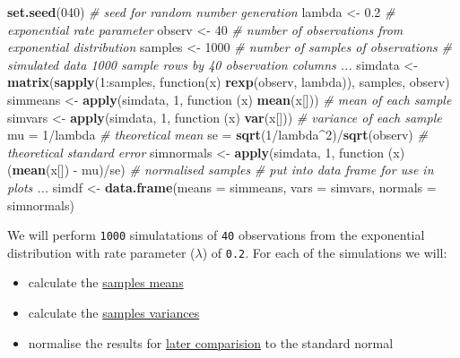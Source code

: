 \documentclass[legalpaper]{article}
\newenvironment{Shaded}{\begin{snugshade}}{\end{snugshade}}
\newcommand{\KeywordTok}[1]{\textcolor[rgb]{0.13,0.29,0.53}{\textbf{{#1}}}}
\newcommand{\DataTypeTok}[1]{\textcolor[rgb]{0.13,0.29,0.53}{{#1}}}
\newcommand{\DecValTok}[1]{\textcolor[rgb]{0.00,0.00,0.81}{{#1}}}
\newcommand{\FloatTok}[1]{\textcolor[rgb]{0.00,0.00,0.81}{{#1}}}
\newcommand{\StringTok}[1]{\textcolor[rgb]{0.31,0.60,0.02}{{#1}}}
\newcommand{\CommentTok}[1]{\textcolor[rgb]{0.56,0.35,0.01}{\textit{{#1}}}}
\newcommand{\NormalTok}[1]{{#1}}
\begin{document}
\begin{Shaded}
\begin{Highlighting}[]
\KeywordTok{set.seed}\NormalTok{(}\DecValTok{040}\NormalTok{)       }\CommentTok{# seed for random number generation}
\NormalTok{lambda <-}\StringTok{ }\FloatTok{0.2}       \CommentTok{# exponential rate parameter}
\NormalTok{observ <-}\StringTok{ }\DecValTok{40}        \CommentTok{# number of observations from exponential distribution}
\NormalTok{samples <-}\StringTok{ }\DecValTok{1000}     \CommentTok{# number of samples of observations}
\CommentTok{# simulated data 1000 sample rows by 40 observation columns ...}
\NormalTok{simdata <-}\StringTok{ }\KeywordTok{matrix}\NormalTok{(}\KeywordTok{sapply}\NormalTok{(}\DecValTok{1}\NormalTok{:samples, function(x) }\KeywordTok{rexp}\NormalTok{(observ, lambda)), samples, observ)}
\NormalTok{simmeans <-}\StringTok{ }\KeywordTok{apply}\NormalTok{(simdata, }\DecValTok{1}\NormalTok{, function (x) }\KeywordTok{mean}\NormalTok{(x[]))   }\CommentTok{# mean of each sample}
\NormalTok{simvars <-}\StringTok{ }\KeywordTok{apply}\NormalTok{(simdata, }\DecValTok{1}\NormalTok{, function (x) }\KeywordTok{var}\NormalTok{(x[]))     }\CommentTok{# variance of each sample}
\NormalTok{mu =}\StringTok{ }\DecValTok{1}\NormalTok{/lambda                                           }\CommentTok{# theoretical mean}
\NormalTok{se =}\StringTok{ }\KeywordTok{sqrt}\NormalTok{(}\DecValTok{1}\NormalTok{/lambda^}\DecValTok{2}\NormalTok{)/}\KeywordTok{sqrt}\NormalTok{(observ)                      }\CommentTok{# theoretical standard error}
\NormalTok{simnormals <-}\StringTok{ }\KeywordTok{apply}\NormalTok{(simdata, }\DecValTok{1}\NormalTok{, function (x) (}\KeywordTok{mean}\NormalTok{(x[]) -}\StringTok{ }\NormalTok{mu)/se) }\CommentTok{# normalised samples}
\CommentTok{# put into data frame for use in plots ...}
\NormalTok{simdf <-}\StringTok{ }\KeywordTok{data.frame}\NormalTok{(}\DataTypeTok{means =} \NormalTok{simmeans, }\DataTypeTok{vars =} \NormalTok{simvars, }\DataTypeTok{normals =} \NormalTok{simnormals)}
\end{Highlighting}
\end{Shaded}

We will perform \texttt{1000} simulatations of \texttt{40} observations
from the exponential distribution with rate parameter (\(\lambda\)) of
\texttt{0.2}. For each of the simulations we will:

\begin{itemize}
\itemsep1pt\parskip0pt
\item
  calculate the \hyperref[sample-mean-versus-theoretical-mean]{samples
  means}
\item
  calculate the
  \hyperref[sample-variance-versus-theoretical-variance]{samples
  variances}
\item
  normalise the results for
  \hyperref[distribution-is-approximately-normal]{later comparision} to
  the standard normal
\end{itemize}
\end{document}
